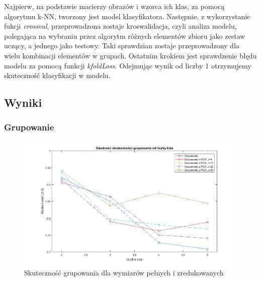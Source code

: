 \vspace{5mm} 

Najpierw, na podstawie macierzy obrazów i wzorca ich klas, za pomocą algorytmu k-NN, tworzony jest model klasyfikatora. Następnie, z wykorzystanie fukcji \textit{crossval}, przeprowadzona zostaje kroswalidacja, czyli analiza modelu, polegająca na wybraniu przez algorytm różnych elementów zbioru jako zestaw uczący, a jednego jako testowy. Taki sprawdzian zostaje przeprowadzony dla wielu kombinacji elementów w grupach. Ostatnim krokiem jest sprawdzenie błędu modelu za pomocą funkcji \textit{kfoldLoss}. Odejmując wynik od liczby 1 otrzymujemy skuteczność klasyfikacji w modelu. 


\subsection{Wyniki}

\subsubsection{Grupowanie}

\begin{figure}[H]
	\centering
	\hspace*{-0.8in}
	\includegraphics[scale = 0.7]{img/acc_from_classes_group.png}
	\caption{Skuteczność grupowania dla wymiarów pełnych i zredukowanych}  
	\label{rys:acc_from_classes_group} 
\end{figure}

